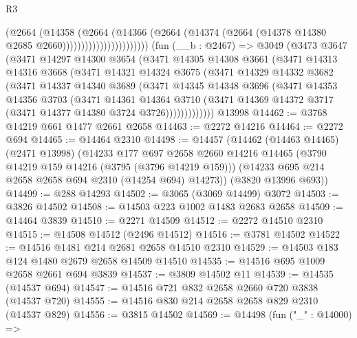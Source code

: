 \begin{lexlean}{R3}
\begin{coremodule}
                                  (@2664
                                    (@14358
                                      (@2664
                                        (@14366
                                          (@2664
                                            (@14374
                                              (@2664
                                                (@14378 @14380 @2685 @2660)))))))))))))))))))))))
    (fun (__b : @2467) =>
    @3049
      (@3473
        @3647
        (@3471
          @14297
          @14300
          @3654
          (@3471
            @14305
            @14308
            @3661
            (@3471
              @14313
              @14316
              @3668
              (@3471
                @14321
                @14324
                @3675
                (@3471
                  @14329
                  @14332
                  @3682
                  (@3471
                    @14337
                    @14340
                    @3689
                    (@3471
                      @14345
                      @14348
                      @3696
                      (@3471
                        @14353
                        @14356
                        @3703
                        (@3471
                          @14361
                          @14364
                          @3710
                          (@3471 @14369 @14372 @3717 (@3471 @14377 @14380 @3724 @3726)))))))))))))
    @13998
@14462 := @3768 @14219 @661 @1477 @2661 @2658
@14463 := @2272 @14216
@14464 := @2272 @694
@14465 := @14464 @2310
@14498 := @14457
    (@14462
      (@14463 @14465)
      (@2471 @13998)
      (@14233
        @177
        @697
        @2658
        @2660
        @14216
        @14465
        (@3790 @14219 @159 @14216 (@3795 (@3796 @14219 @159)))
        (@14233 @695 @214 @2658 @2658 @694 @2310 (@14254 @694) @14273))
      (@3820 @13996 @693))
@14499 := @288 @14293
@14502 := @3065 (@3069 @14499) @3072
@14503 := @3826 @14502
@14508 := @14503 @223 @1002 @1483 @2683 @2658
@14509 := @14464 @3839
@14510 := @2271 @14509
@14512 := @2272 @14510 @2310
@14515 := @14508 @14512 (@2496 @14512)
@14516 := @3781 @14502
@14522 := @14516 @1481 @214 @2681 @2658 @14510 @2310
@14529 := @14503 @183 @124 @1480 @2679 @2658 @14509 @14510
@14535 := @14516 @695 @1009 @2658 @2661 @694 @3839
@14537 := @3809 @14502 @11
@14539 := @14535 (@14537 @694)
@14547 := @14516 @721 @832 @2658 @2660 @720 @3838 (@14537 @720)
@14555 := @14516 @830 @214 @2658 @2658 @829 @2310 (@14537 @829)
@14556 := @3815 @14502
@14569 := @14498
    (fun ("_" : @14000) =>

\end{coremodule}
\end{lexlean}
